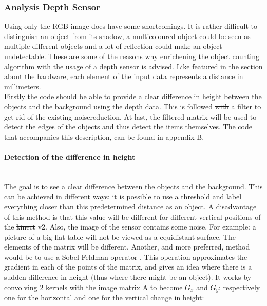 \documentclass{article}
\providecommand{\DIFaddtex}[1]{{\protect\color{blue}\uwave{#1}}} %
\providecommand{\DIFdeltex}[1]{{\protect\color{red}\sout{#1}}}                      %
\providecommand{\DIFaddbegin}{} %
\providecommand{\DIFaddend}{} %
\providecommand{\DIFdelbegin}{} %
\providecommand{\DIFdelend}{} %
\providecommand{\DIFadd}[1]{\texorpdfstring{\DIFaddtex{#1}}{#1}} %
\providecommand{\DIFdel}[1]{\texorpdfstring{\DIFdeltex{#1}}{}} %
\newcommand{\DIFscaledelfig}{0.5}
\newlength{\DIFdelgraphicswidth} %
\newlength{\DIFdelgraphicsheight} %
\newcommand{\DIFaddincludegraphics}[2][]{{\color{blue}\fbox{\DIFOincludegraphics[#1]{#2}}}} %
\newcommand{\DIFdelincludegraphics}[2][]{%
\sbox{\DIFdelgraphicsbox}{\DIFOincludegraphics[#1]{#2}}%
\settoboxwidth{\DIFdelgraphicswidth}{\DIFdelgraphicsbox} %
\settoboxtotalheight{\DIFdelgraphicsheight}{\DIFdelgraphicsbox} %
\scalebox{\DIFscaledelfig}{%
\parbox[b]{\DIFdelgraphicswidth}{\usebox{\DIFdelgraphicsbox}\\[-\baselineskip] \rule{\DIFdelgraphicswidth}{0em}}\llap{\resizebox{\DIFdelgraphicswidth}{\DIFdelgraphicsheight}{%
\setlength{\unitlength}{\DIFdelgraphicswidth}%
\begin{picture}(1,1)%
\thicklines\linethickness{2pt} %
{\color[rgb]{1,0,0}\put(0,0){\framebox(1,1){}}}%
{\color[rgb]{1,0,0}\put(0,0){\line( 1,1){1}}}%
{\color[rgb]{1,0,0}\put(0,1){\line(1,-1){1}}}%
\end{picture}%
}\hspace*{3pt}}} %
} %
\DeclareRobustCommand{\DIFaddbegin}{\DIFOaddbegin \let\includegraphics\DIFaddincludegraphics} %
\DeclareRobustCommand{\DIFaddend}{\DIFOaddend \let\includegraphics\DIFOincludegraphics} %
\DeclareRobustCommand{\DIFdelbegin}{\DIFOdelbegin \let\includegraphics\DIFdelincludegraphics} %
\DeclareRobustCommand{\DIFdelend}{\DIFOaddend \let\includegraphics\DIFOincludegraphics} %
\begin{document}
\subsubsection{Analysis Depth Sensor}
Using only the RGB image does have some shortcomings\DIFdelbegin \DIFdel{. It }\DIFdelend \DIFaddbegin \DIFadd{, for example, it }\DIFaddend is rather difficult to distinguish an object from its shadow, a multicoloured object could be seen as multiple different objects and a lot of reflection could make an object undetectable. These are some of the reasons why enrichening the object counting algorithm with the usage of a depth sensor is advised. Like featured in the section about the hardware, each element of the input data represents a distance in millimeters.\\
Firstly the code should be able to provide a clear difference in height between the objects and the background using the depth data. This is followed \DIFdelbegin \DIFdel{with }\DIFdelend \DIFaddbegin \DIFadd{by }\DIFaddend a filter to get rid of the existing noise\DIFdelbegin \DIFdel{reduction}\DIFdelend . At last, the filtered matrix will be used to detect the edges of the objects and thus detect the items themselves. The code that accompanies this description, can be found in appendix \DIFdelbegin \DIFdel{B}\DIFdelend \DIFaddbegin \DIFadd{E}\DIFaddend .

\paragraph{Detection of the difference in height}\mbox{}\\
The goal is to see a clear difference between the objects and the background. This can be achieved in different ways: it is possible to use a threshold and label everything closer than this predetermined distance as an object. A disadvantage of this method is that this value will be different for \DIFdelbegin \DIFdel{different }\DIFdelend \DIFaddbegin \DIFadd{various }\DIFaddend vertical positions of the \DIFdelbegin \DIFdel{kinect }\DIFdelend \DIFaddbegin \DIFadd{Kinect }\DIFaddend v2. Also, the image of the sensor contains some noise. For example: a picture of a big flat table will not be viewed as a equidistant surface. The elements of the matrix will be different. Another, and more preferred, method would be to use a Sobel-Feldman operator \cite{Sobel_operator}. This operation approximates the gradient in each of the points of the matrix, and gives an idea where there is a sudden difference in height (thus where there might be an object). It works by convolving 2 kernels with the image matrix A to become $G_{x}$ and $G_{y}$: respectively one for the horizontal and one for the vertical change in height: 
\end{document}
